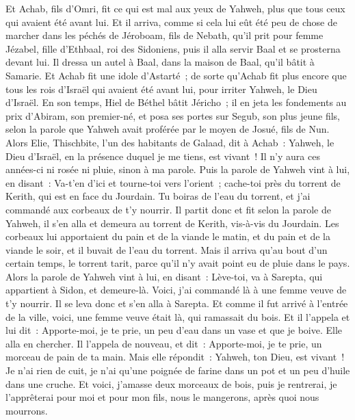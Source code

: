 \begin{multicols}{2}
Et Achab, fils d'Omri, fit ce qui est mal aux yeux de Yahweh, plus que tous ceux qui avaient été avant lui.
Et il arriva, comme si cela lui eût été peu de chose de marcher dans les péchés de Jéroboam, fils de Nebath, qu'il prit pour femme Jézabel, fille d'Ethbaal, roi des Sidoniens, puis il alla servir Baal et se prosterna devant lui.
Il dressa un autel à Baal, dans la maison de Baal, qu'il bâtit à Samarie.
Et Achab fit une idole d'Astarté~; de sorte qu'Achab fit plus encore que tous les rois d'Israël qui avaient été avant lui, pour irriter Yahweh, le Dieu d'Israël.
En son temps, Hiel de Béthel bâtit Jéricho~; il en jeta les fondements au prix d'Abiram, son premier-né, et posa ses portes sur Segub, son plus jeune fils, selon la parole que Yahweh avait proférée par le moyen de Josué, fils de Nun.
\VerseOne{}Alors Elie, Thischbite, l'un des habitants de Galaad, dit à Achab~: Yahweh, le Dieu d'Israël, en la présence duquel je me tiens, est vivant~! Il n'y aura ces années-ci ni rosée ni pluie, sinon à ma parole.
Puis la parole de Yahweh vint à lui, en disant~:
Va-t'en d'ici et tourne-toi vers l'orient~; cache-toi près du torrent de Kerith, qui est en face du Jourdain.
Tu boiras de l'eau du torrent, et j'ai commandé aux corbeaux de t'y nourrir.
Il partit donc et fit selon la parole de Yahweh, il s'en alla et demeura au torrent de Kerith, vis-à-vis du Jourdain.
Les corbeaux lui apportaient du pain et de la viande le matin, et du pain et de la viande le soir, et il buvait de l'eau du torrent.
Mais il arriva qu'au bout d'un certain temps, le torrent tarit, parce qu'il n'y avait point eu de pluie dans le pays.
Alors la parole de Yahweh vint à lui, en disant~:
Lève-toi, va à Sarepta, qui appartient à Sidon, et demeure-là. Voici, j'ai commandé là à une femme veuve de t'y nourrir.
Il se leva donc et s'en alla à Sarepta. Et comme il fut arrivé à l'entrée de la ville, voici, une femme veuve était là, qui ramassait du bois. Et il l'appela et lui dit~: Apporte-moi, je te prie, un peu d'eau dans un vase et que je boive.
Elle alla en chercher. Il l'appela de nouveau, et dit~: Apporte-moi, je te prie, un morceau de pain de ta main.
Mais elle répondit~: Yahweh, ton Dieu, est vivant~! Je n'ai rien de cuit, je n'ai qu'une poignée de farine dans un pot et un peu d'huile dans une cruche. Et voici, j'amasse deux morceaux de bois, puis je rentrerai, je l'apprêterai pour moi et pour mon fils, nous le mangerons, après quoi nous mourrons.

\end{multicols}
